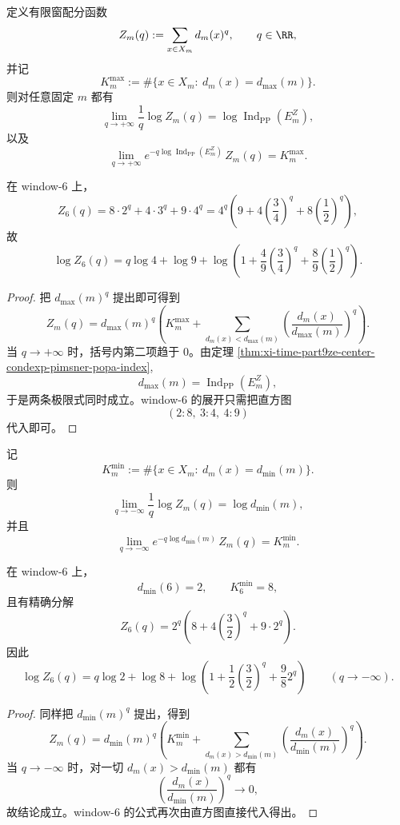 \begin{theorem}[正零温冻结的有限窗精确式]\label{thm:xi-time-part9ze-positive-zero-temperature-freezing}
定义有限窗配分函数
\[
Z_m(q):=\sum_{x\in X_m}d_m(x)^q,
\qquad q\in \RR,
\]
并记
\[
K_m^{\max}:=\#\{x\in X_m:\ d_m(x)=d_{\max}(m)\}.
\]
则对任意固定 \(m\) 都有
\[
\lim_{q\to+\infty}\frac{1}{q}\log Z_m(q)
=
\log \operatorname{Ind}_{\mathrm{PP}}(E_m^Z),
\]
以及
\[
\lim_{q\to+\infty}
e^{-q\log \operatorname{Ind}_{\mathrm{PP}}(E_m^Z)}\,Z_m(q)
=
K_m^{\max}.
\]

在 window-\(6\) 上，
\[
Z_6(q)=8\cdot 2^q+4\cdot 3^q+9\cdot 4^q
=
4^q\left(
9+4\left(\frac{3}{4}\right)^q+8\left(\frac{1}{2}\right)^q
\right),
\]
故
\[
\log Z_6(q)
=
q\log 4+\log 9+
\log\!\left(
1+\frac{4}{9}\left(\frac{3}{4}\right)^q
+\frac{8}{9}\left(\frac{1}{2}\right)^q
\right).
\]
\end{theorem}
\begin{proof}
把 \(d_{\max}(m)^q\) 提出即可得到
\[
Z_m(q)
=
d_{\max}(m)^q
\left(
K_m^{\max}
+
\sum_{d_m(x)<d_{\max}(m)}
\left(
\frac{d_m(x)}{d_{\max}(m)}
\right)^q
\right).
\]
当 \(q\to+\infty\) 时，括号内第二项趋于 \(0\)。由定理
\ref{thm:xi-time-part9ze-center-condexp-pimsner-popa-index},
\[
d_{\max}(m)=\operatorname{Ind}_{\mathrm{PP}}(E_m^Z),
\]
于是两条极限式同时成立。window-\(6\) 的展开只需把直方图
\[
(2:8,\ 3:4,\ 4:9)
\]
代入即可。
\end{proof}

\begin{theorem}[负零温冻结与冷基态计数]\label{thm:xi-time-part9ze-negative-zero-temperature-freezing}
记
\[
K_m^{\min}:=\#\{x\in X_m:\ d_m(x)=d_{\min}(m)\}.
\]
则
\[
\lim_{q\to-\infty}\frac{1}{q}\log Z_m(q)=\log d_{\min}(m),
\]
并且
\[
\lim_{q\to-\infty}e^{-q\log d_{\min}(m)}\,Z_m(q)=K_m^{\min}.
\]

在 window-\(6\) 上，
\[
d_{\min}(6)=2,
\qquad
K_6^{\min}=8,
\]
且有精确分解
\[
Z_6(q)
=
2^q\left(
8+4\left(\frac{3}{2}\right)^q+9\cdot 2^q
\right).
\]
因此
\[
\log Z_6(q)
=
q\log 2+\log 8+
\log\!\left(
1+\frac{1}{2}\left(\frac{3}{2}\right)^q+\frac{9}{8}2^q
\right)
\qquad (q\to-\infty).
\]
\end{theorem}
\begin{proof}
同样把 \(d_{\min}(m)^q\) 提出，得到
\[
Z_m(q)
=
d_{\min}(m)^q
\left(
K_m^{\min}
+
\sum_{d_m(x)>d_{\min}(m)}
\left(
\frac{d_m(x)}{d_{\min}(m)}
\right)^q
\right).
\]
当 \(q\to-\infty\) 时，对一切 \(d_m(x)>d_{\min}(m)\) 都有
\[
\left(
\frac{d_m(x)}{d_{\min}(m)}
\right)^q\to 0,
\]
故结论成立。window-\(6\) 的公式再次由直方图直接代入得出。
\end{proof}

